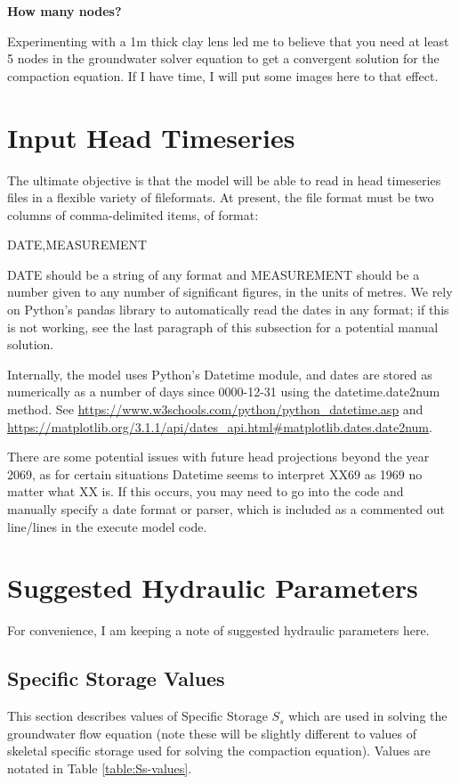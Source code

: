\documentclass{article}
\begin{document}
\textbf{How many nodes?}

Experimenting with a 1m thick clay lens led me to believe that you need at least 5 nodes in the groundwater solver equation to get a convergent solution for the compaction equation. If I have time, I will put some images here to that effect.

\section{Input Head Timeseries}

The ultimate objective is that the model will be able to read in head timeseries files in a flexible variety of fileformats. At present, the file format must be two columns of comma-delimited items, of format:

DATE,MEASUREMENT

DATE should be a string of any format and MEASUREMENT should be a number given to any number of significant figures, in the units of metres. We rely on Python's pandas library to automatically read the dates in any format; if this is not working, see the last paragraph of this subsection for a potential manual solution.

Internally, the model uses Python's Datetime module, and dates are stored as numerically as a number of days since 0000-12-31 using the datetime.date2num method. See \url{https://www.w3schools.com/python/python_datetime.asp} and \url{https://matplotlib.org/3.1.1/api/dates_api.html\#matplotlib.dates.date2num}.

There are some potential issues with future head projections beyond the year 2069, as for certain situations Datetime seems to interpret XX69 as 1969 no matter what XX is. If this occurs, you may need to go into the code and manually specify a date format or parser, which is included as a commented out line/lines in the execute model code.

\section{Suggested Hydraulic Parameters}

For convenience, I am keeping a note of suggested hydraulic parameters here. 

\subsection{Specific Storage Values}

This section describes values of Specific Storage $S_s$ which are used in solving the groundwater flow equation (note these will be slightly different to values of skeletal specific storage used for solving the compaction equation). Values are notated in Table \ref{table:Ss-values}.
\end{document}
